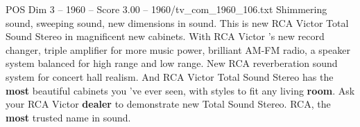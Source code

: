 \begin{textsample}{POS Dim 3 – 1960 – Score 3.00 – 1960/tv\_com\_1960\_106.txt}  \label{ex:f3_pos_025}
Shimmering sound, sweeping sound, new dimensions in sound.
This is new RCA Victor Total Sound Stereo in magnificent new cabinets.
With RCA Victor 's new record changer, triple amplifier for more music power, brilliant AM-FM radio, a speaker system balanced for high range and low range.
New RCA reverberation sound system for concert hall realism.
And RCA Victor Total Sound Stereo has the \textbf{most} beautiful cabinets you 've ever seen, with styles to fit any living \textbf{room}.
Ask your RCA Victor \textbf{dealer} to demonstrate new Total Sound Stereo.
RCA, the \textbf{most} trusted name in sound.

\end{textsample}
